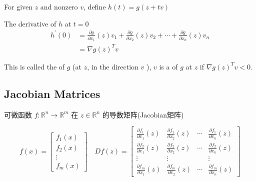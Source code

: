 \begin{definition}
    For given $ z $ and nonzero $ v $, define $ h(t)=g(z+t v) $

   The derivative of $ h $ at $ t=0 $
$$
\begin{aligned}
h^{\prime}(0) &=\frac{\partial g}{\partial x_{1}}(z) v_{1}+\frac{\partial g}{\partial x_{2}}(z) v_{2}+\cdots+\frac{\partial g}{\partial x_{n}}(z) v_{n} \\
&=\nabla g(z)^{T} v
\end{aligned}
$$

This is called the  of $ g $ (at $ z $, in the direction $ v $ ), $ v $ is a  of $ g $ at $ z $ if $ \nabla g(z)^{T} v<0 $.
\end{definition}

\subsection{Jacobian Matrices}


\begin{definition}
    可微函数 $ f: \mathbb{R}^{n} \rightarrow \mathbb{R}^{m} $ 在 $ z \in \mathbb{R}^{n} $ 的导数矩阵(Jacobian矩阵)

$$
f(x)=\left[\begin{array}{c}
f_{1}(x) \\
f_{2}(x) \\
\vdots \\
f_{m}(x)
\end{array}\right] \quad D f(z)=\left[\begin{array}{cccc}
\frac{\partial f_{1}}{\partial x_{1}}(z) & \frac{\partial f_{1}}{\partial x_{2}}(z) & \cdots & \frac{\partial f_{1}}{\partial x_{n}}(z) \\
\frac{\partial f_{2}}{\partial x_{1}}(z) & \frac{\partial f_{2}}{\partial x_{2}}(z) & \cdots & \frac{\partial f_{2}}{\partial x_{n}}(z) \\
\vdots & \vdots & & \vdots \\
\frac{\partial f_{m}}{\partial x_{1}}(z) & \frac{\partial f_{m}}{\partial x_{2}}(z) & \cdots & \frac{\partial f_{m}}{\partial x_{n}}(z)
\end{array}\right]
$$
\end{definition}

